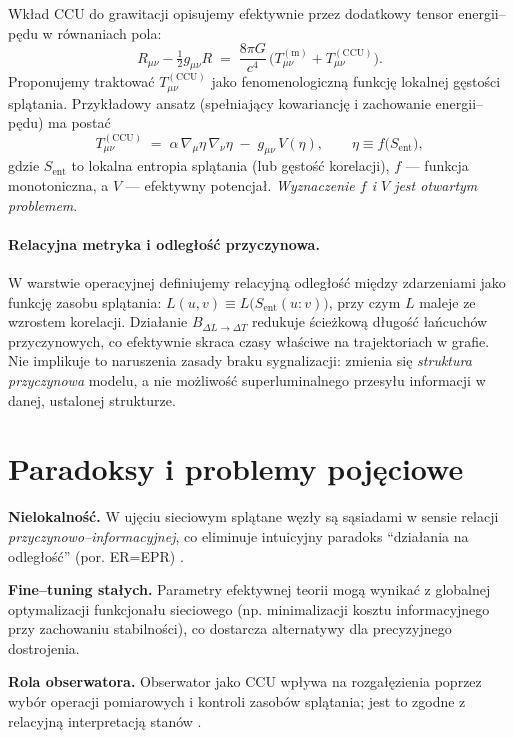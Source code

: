 \documentclass[11pt,a4paper]{article}
\begin{document}
Wkład CCU do grawitacji opisujemy efektywnie przez dodatkowy tensor energii--pędu w równaniach pola:
\begin{equation}
R_{\mu\nu} - \tfrac{1}{2} g_{\mu\nu} R \;=\; \frac{8\pi G}{c^4}\,\Big(T^{\mathrm{(m)}}_{\mu\nu} + T^{\mathrm{(CCU)}}_{\mu\nu}\Big).
\end{equation}
Proponujemy traktować $T^{\mathrm{(CCU)}}_{\mu\nu}$ jako fenomenologiczną funkcję lokalnej gęstości splątania. Przykładowy ansatz (spełniający kowariancję i zachowanie energii--pędu) ma postać
\begin{equation}
T^{\mathrm{(CCU)}}_{\mu\nu} \;=\; \alpha\, \nabla_{\mu}\eta\, \nabla_{\nu}\eta \;-\; g_{\mu\nu}\,V(\eta), \qquad
\eta \equiv f\big(S_{\mathrm{ent}}\big),
\end{equation}
gdzie $S_{\mathrm{ent}}$ to lokalna entropia splątania (lub gęstość korelacji), $f$ --- funkcja monotoniczna, a $V$ --- efektywny potencjał. \emph{Wyznaczenie $f$ i $V$ jest otwartym problemem}.

\paragraph{Relacyjna metryka i odległość przyczynowa.}
W warstwie operacyjnej definiujemy relacyjną odległość między zdarzeniami jako funkcję zasobu splątania: $L(u,v)\!\equiv\!L\big(S_{\mathrm{ent}}(u{:}v)\big)$, przy czym $L$ maleje ze wzrostem korelacji. Działanie $B_{\Delta L \to \Delta T}$ redukuje ścieżkową długość łańcuchów przyczynowych, co efektywnie skraca czasy właściwe na trajektoriach w grafie. Nie implikuje to naruszenia zasady braku sygnalizacji: zmienia się \emph{struktura przyczynowa} modelu, a nie możliwość superluminalnego przesyłu informacji w danej, ustalonej strukturze.

\section{Paradoksy i problemy pojęciowe}
\textbf{Nielokalność.} W ujęciu sieciowym splątane węzły są sąsiadami w sensie relacji \emph{przyczynowo--informacyjnej}, co eliminuje intuicyjny paradoks ``działania na odległość'' (por. ER=EPR) \cite{MaldacenaSusskind2013}.

\textbf{Fine--tuning stałych.} Parametry efektywnej teorii mogą wynikać z globalnej optymalizacji funkcjonału sieciowego (np. minimalizacji kosztu informacyjnego przy zachowaniu stabilności), co dostarcza alternatywy dla precyzyjnego dostrojenia.

\textbf{Rola obserwatora.} Obserwator jako CCU wpływa na rozgałęzienia poprzez wybór operacji pomiarowych i kontroli zasobów splątania; jest to zgodne z relacyjną interpretacją stanów \cite{Rovelli2004,Everett1957}.
\end{document}

